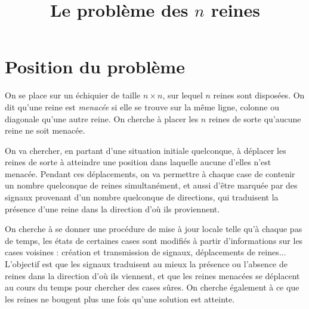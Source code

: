 \documentclass[11pt, openany]{article}
\newcommand{\N}{\mathbb{N}}
\newcommand{\B}{\mathbb{B}}
\begin{document}
\renewcommand{\labelitemi}{$\bullet$}
\title{Le problème des $n$ reines}
\date{}
\author{}
\maketitle
\section*{Position du problème}

On se place sur un échiquier de taille $n \times n$, sur lequel $n$ reines sont disposées. On dit qu'une reine est \emph{menacée} si elle se trouve sur la même ligne, colonne ou diagonale qu'une autre reine. On cherche à placer les $n$ reines de sorte qu'aucune reine ne soit menacée. 

On va chercher, en partant d'une situation initiale quelconque, à déplacer les reines de sorte à atteindre une position dans laquelle aucune d'elles n'est menacée. Pendant ces déplacements, on va permettre à chaque case de contenir un nombre quelconque de reines simultanément, et aussi d'être marquée par des signaux provenant d'un nombre quelconque de directions, qui traduisent la présence d'une reine dans la direction d'où ils proviennent.



On cherche à se donner une procédure de mise à jour locale telle qu'à chaque pas de temps, les états de certaines cases sont modifiés à partir d'informations sur les cases voisines : création et transmission de signaux, déplacements de reines... L'objectif est que les signaux traduisent au mieux la présence ou l'absence de reines dans la direction d'où ils viennent, et que les reines menacées se déplacent au cours du temps pour chercher des cases sûres. On cherche également à ce que les reines ne bougent plus une fois qu'une solution est atteinte. 
\end{document}

